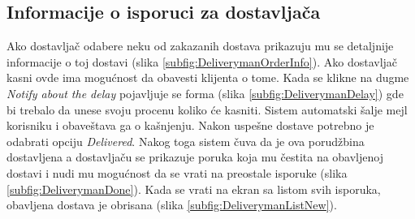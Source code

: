 \subsection{Informacije o isporuci za dostavljača}

Ako dostavljač odabere neku od zakazanih dostava prikazuju mu se detaljnije informacije o toj dostavi (slika \ref{subfig:DeliverymanOrderInfo}).
Ako dostavljač kasni ovde ima mogućnost da obavesti klijenta o tome. Kada se klikne na dugme \textit{Notify about the delay} pojavljuje se forma (slika \ref{subfig:DeliverymanDelay}) gde bi trebalo da unese svoju procenu koliko će kasniti. Sistem automatski šalje mejl korisniku i obaveštava ga o kašnjenju.
Nakon uspešne dostave potrebno je odabrati opciju \textit{Delivered}. Nakog toga sistem čuva da je ova porudžbina dostavljena a dostavljaču se prikazuje poruka koja mu čestita na obavljenoj dostavi i nudi mu mogućnost da se vrati na preostale isporuke (slika \ref{subfig:DeliverymanDone}). Kada se vrati na ekran sa listom svih isporuka, obavljena dostava je obrisana (slika \ref{subfig:DeliverymanListNew}).



